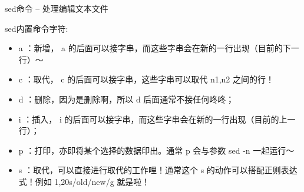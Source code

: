 \begin{ascolorbox5}{sed命令 – 处理编辑文本文件}
	\begin{ascboxB}{sed内置命令字符:}
	\begin{itemize}
		\item a ：新增， a 的后面可以接字串，而这些字串会在新的一行出现（目前的下一行）～
		\item c ：取代， c 的后面可以接字串，这些字串可以取代 n1,n2 之间的行！
		\item d ：删除，因为是删除啊，所以 d 后面通常不接任何咚咚；
		\item i ：插入， i 的后面可以接字串，而这些字串会在新的一行出现（目前的上一行）；
		\item p ：打印，亦即将某个选择的数据印出。通常 p 会与参数 sed -n 一起运行～
		\item s ：取代，可以直接进行取代的工作哩！通常这个 s 的动作可以搭配正则表达式！例如 1,20s/old/new/g 就是啦！
	\end{itemize}
\end{ascboxB}
\end{ascolorbox5}


